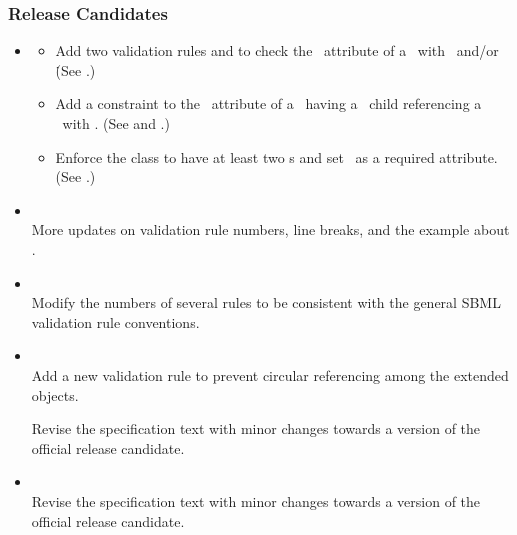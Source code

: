 \subsubsection{Release Candidates}

\begin{itemize}
  \item {} 
  \label{def:v1_1_rc5}
    \begin{itemize}
      \item Add two validation rules  and  to check the \speciesTypeAtt\ attribute of a \species\ with \listOfOutwardBindingSites\ and/or \listOfSpeciesFeatures\. (See .)
      \item Add a constraint to the \relationAtt\ attribute of a \subListOfSpeciesFeatures\ having a \speciesFeature\ child referencing a \speciesFeatureType\ with . (See  and .)
      \item Enforce the \SubListOfSpeciesFeatures class to have at least two \speciesFeature s and set \relationAtt\ as a required attribute. (See .)
    \end{itemize}

  \item {} \\
  \label{def:v1_1_rc4}
  More updates on validation rule numbers, line breaks, and the example about \SubListOfSpeciesFeatures. 

  \item {} \\
  \label{def:v1_1_rc3}
  Modify the numbers of several rules to be consistent with the general SBML validation rule conventions. 

  \item {} \\
  \label{def:v1_1_rc2}
  Add a new validation rule  to prevent circular referencing among the extended \ExCompartment objects.
 
  Revise the specification text with minor changes towards a version of the official release candidate. 

  \item {} \\
  \label{def:v1_1_rc1}
  Revise the specification text with minor changes towards a version of the official release candidate. 

\end{itemize}

